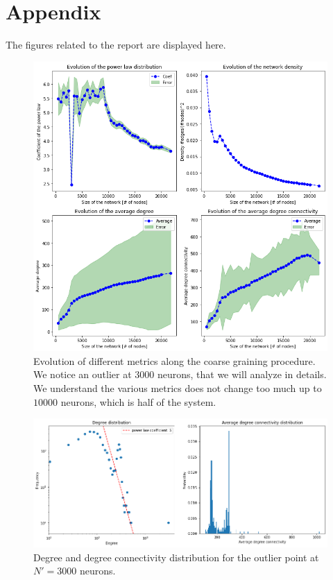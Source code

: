 \section{Appendix \label{sec:app}}
The figures related to the report are displayed here.

\begin{figure}[h]
    \centering
    \includegraphics[width=\textwidth]{Images/Coarse/Evolution_graph_coearse.png}
    \caption{Evolution of different metrics along the coarse graining procedure.
    We notice an outlier at $3000$ neurons, that we will analyze in details. We understand
    the various metrics does not change too much up to $10000$ neurons, which is half 
    of the system.}
    \label{fig:coarse_evol}
\end{figure}

\begin{figure}
    \centering
    \includegraphics[width=\textwidth]{Images/Coarse/Outlier_distribution.png}
    \caption{Degree and degree connectivity distribution for the outlier point at $N'=3000$ neurons.}
    \label{fig:n3000}
\end{figure}

